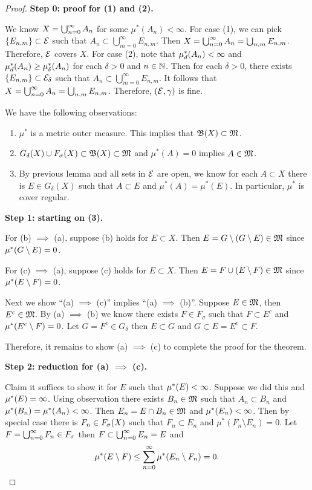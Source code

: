 \documentclass[a4paper]{article}
\begin{document}
\begin{proof}

\textbf{Step 0: proof for (1) and (2).}

We know $X = \bigcup_{n=0}^\infty A_n$ for some $\mu^*
(A_n) < \infty$. For case (1), we can pick $\left\{ E_{n, m} \right\}
\subset \mathcal{E}$
such that $A_n \subset \bigcup_{m=0}^\infty E_{n, m}$. Then
$X = \bigcup_{n=0}^\infty A_n = \bigcup_{n, m} E_{n, m}$. Therefore,
$\mathcal{E}$ covers $X$.
For case (2), note that $\mu^*_d(A_n) < \infty$
and $\mu^*_d(A_n) \geq \mu^*_\delta(A_n)$
for each $\delta > 0$ and $n \in \mathbb{N}$.
Then for each $\delta > 0$,
there exists $\left\{ E_{n, m} \right\} \subset \mathcal{E}_\delta$
such that $A_n \subset \bigcup_{m=0}^\infty E_{n, m}$.
It follows that
$X = \bigcup_{n=0}^\infty A_n = \bigcup_{n, m} E_{n, m}$. Therefore,
$(\mathcal{E}, \gamma)$ is fine.

We have the following observations:
\begin{enumerate}
  \item $\mu^*$ is a metric outer measure. This implies that
  $\mathfrak{B}(X) \subset \mathfrak{M}$.
  \item $G_\delta(X) \cup F_\sigma(X) \subset \mathfrak{B}(X) \subset \mathfrak{M}$
  and $\mu^*(A) = 0$ implies $A \in \mathfrak{M}$.
  \item By previous lemma and all sets in $\mathcal{E}$ are open,
  we know for each $A \subset X$ there is $E \in G_\delta(X)$
  such that $A \subset E$ and $\mu^*(A) = \mu^*(E)$.
  In particular, $\mu^*$ is cover regular.
\end{enumerate}

\textbf{Step 1: starting on (3).}

For (b) $\implies$ (a), suppose (b) holds for $E \subset X$.
Then $E = G \setminus (G \setminus E) \in \mathfrak{M}$ since
$\mu^*(G \setminus E) = 0$.

For (c) $\implies$ (a), suppose (c) holds for $E \subset X$.
Then $E = F \cup (E \setminus F) \in \mathfrak{M}$ since
$\mu^*(E \setminus F) = 0$.

Next we show ``(a) $\implies$ (c)'' implies
``(a) $\implies$ (b)''. Suppose $E \in \mathfrak{M}$, then
$E^c \in \mathfrak{M}$. By (a) $\implies$ (b) we know there exists
$F \in F_\sigma$ such that $F \subset E^c$ and
$\mu^*(E^c \setminus F) = 0$. Let $G = F^c \in G_\delta$
then $E \subset G$ and $G \subset E = E^c \subset F$.

Therefore, it remains to show (a) $\implies$ (c) to complete
the proof for the theorem.

\textbf{Step 2: reduction for (a) $\implies$ (c).}

Claim it suffices to show it for $E$ such that $\mu^*(E) < \infty$.
Suppose we did this and $\mu^*(E) = \infty$. Using observation
there exists $B_n \in \mathfrak{M}$ such that $A_n \subset B_n$
and $\mu^*(B_n) = \mu^* (A_n) < \infty$. Then $E_n = E \cap B_n
\in \mathfrak{M}$ and $\mu^*(E_n) < \infty$. Then by special case there
is $F_n \in F_\sigma(X)$ such that $F_n \subset E_n$ and
$\mu^*(F_n \setminus E_n) = 0$. Let $F = \bigcup_{n=0}^\infty F_n \in F_\sigma$
then $F \subset \bigcup_{n=0}^\infty E_n = E$ and
\[
\mu^*(E \setminus F) \leq \sum_{n=0}^\infty \mu^* (E_n \setminus F_n) = 0.
\]


\end{proof}
\end{document}
